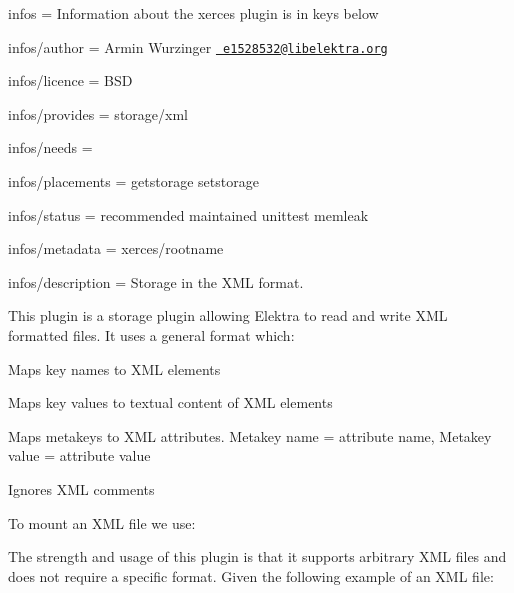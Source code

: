 
\begin{DoxyItemize}
\item infos = Information about the xerces plugin is in keys below
\item infos/author = Armin Wurzinger \href{mailto:e1528532@libelektra.org}{\texttt{ e1528532@libelektra.\+org}}
\item infos/licence = B\+SD
\item infos/provides = storage/xml
\item infos/needs =
\item infos/placements = getstorage setstorage
\item infos/status = recommended maintained unittest memleak
\item infos/metadata = xerces/rootname
\item infos/description = Storage in the X\+ML format.
\end{DoxyItemize}

This plugin is a storage plugin allowing Elektra to read and write X\+ML formatted files. It uses a general format which\+:


\begin{DoxyItemize}
\item Maps key names to X\+ML elements
\item Maps key values to textual content of X\+ML elements
\item Maps metakeys to X\+ML attributes. Metakey name = attribute name, Metakey value = attribute value
\item Ignores X\+ML comments
\end{DoxyItemize}

To mount an X\+ML file we use\+:


\begin{DoxyCode}{0}
\end{DoxyCode}


The strength and usage of this plugin is that it supports arbitrary X\+ML files and does not require a specific format. Given the following example of an X\+ML file\+:


\begin{DoxyCode}{0}
\DoxyCodeLine{<\textcolor{keywordtype}{xerces}>\textcolor{keyword}{foo}}
\DoxyCodeLine{  <\textcolor{keywordtype}{bar} \textcolor{keyword}{meta}=\textcolor{stringliteral}{"da\_ta"}>\textcolor{keyword}{bar}</\textcolor{keywordtype}{bar}>}
\DoxyCodeLine{</\textcolor{keywordtype}{xerces}>}
\end{DoxyCode}


